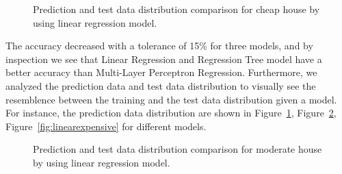 \documentclass[11pt,a4paper]{article}
\begin{document}
\begin{figure}[h]
    \centering
    \hfill%
    \caption{Prediction and test data distribution comparison for cheap house by using linear regression model.}
    \label{fig:linearcheap}
\end{figure}

The accuracy decreased with a tolerance of 15\% for three models, and by inspection we see that Linear Regression and Regression Tree model have a better accuracy than Multi-Layer Perceptron Regression. Furthermore, we analyzed the prediction data and test data distribution to visually see the resemblence between the training and the test data distribution
given a model. For instance, the prediction data distribution are shown in Figure~\ref{fig:linearcheap}, Figure~\ref{fig:linearmoderate}, Figure~\ref{fig:linearexpensive} for different models.

\begin{figure}[h]
    \centering
    \hfill%
    \caption{Prediction and test data distribution comparison for moderate house by using linear regression model.}
    \label{fig:linearmoderate}
\end{figure}
\end{document}

